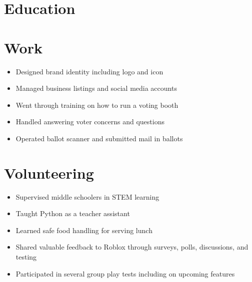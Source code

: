 \documentclass{my_cv} %
\begin{document}

\section{Education}

\section{Work}
\begin{itemize}
    \item Designed brand identity including logo and icon
    \item Managed business listings and social media accounts
\end{itemize}

\begin{itemize}
    \item Went through training on how to run a voting booth
    \item Handled answering voter concerns and questions
    \item Operated ballot scanner and submitted mail in ballots
\end{itemize}

\section{Volunteering}
\begin{itemize}
    \item Supervised middle schoolers in STEM learning
    \item Taught Python as a teacher assistant
    \item Learned safe food handling for serving lunch
\end{itemize}

\begin{itemize}
    \item Shared valuable feedback to Roblox through surveys, polls, discussions, and testing
    \item Participated in several group play tests including on upcoming features
\end{itemize}
\end{document}
